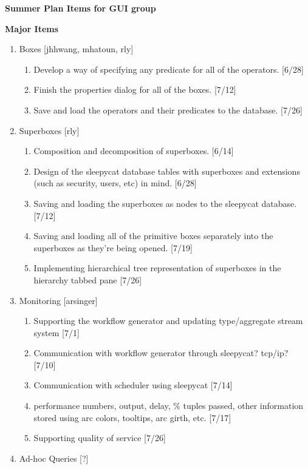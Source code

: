 \documentclass[10pt]{article}
\begin{document}

\begin{center}
\Large \textbf{Summer Plan Items for GUI group} \normalsize
\end{center}

\vspace{.5in}

\Large \textbf{Major Items} \normalsize
\begin{enumerate}

\item Boxes [jhhwang, mhatoun, rly]
\begin{enumerate}
\item Develop a way of specifying any predicate for all of the operators. [6/28]
\item Finish the properties dialog for all of the boxes. [7/12]
\item Save and load the operators and their predicates to the database. [7/26]
\end{enumerate}

\item Superboxes [rly]
\begin{enumerate}
\item Composition and decomposition of superboxes. [6/14]
\item Design of the sleepycat database tables with superboxes and extensions (such as security, users, etc) in mind. [6/28]
\item Saving and loading the superboxes as nodes to the sleepycat database. [7/12]
\item Saving and loading all of the primitive boxes separately into the superboxes as they're being opened. [7/19]
\item Implementing hierarchical tree representation of superboxes in the hierarchy tabbed pane [7/26]
\end{enumerate}

\item Monitoring [arsinger]
\begin{enumerate}
\item Supporting the workflow generator and updating type/aggregate stream
system [7/1]
\item Communication with workflow generator through sleepycat? tcp/ip? [7/10]
\item Communication with scheduler using sleepycat [7/14]
\item performance numbers, output, delay, \% tuples passed, other information
stored using arc colors, tooltips, arc girth, etc. [7/17]
\item Supporting quality of service [7/26]
\end{enumerate}

\item Ad-hoc Queries [?]

\end{enumerate}
\end{document}
